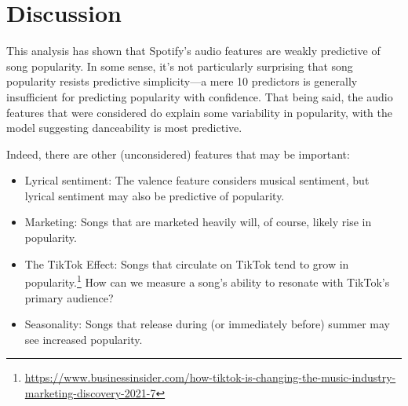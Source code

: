 \documentclass[12pt, twoside]{article}
\begin{document}
\section{Discussion}
This analysis has shown that Spotify's audio features are weakly predictive of song popularity.  In some sense, it's not particularly surprising that song popularity resists predictive simplicity---a mere 10 predictors is generally insufficient for predicting popularity with confidence. That being said, the audio features that were considered do explain some variability in popularity, with the model suggesting danceability is most predictive.  

Indeed, there are other (unconsidered) features that may be important: 
\begin{itemize}
  \item Lyrical sentiment: The valence feature considers musical sentiment, but lyrical sentiment  may also be predictive of popularity.
  \item Marketing: Songs that are marketed heavily will, of course, likely rise in popularity.
  \item The TikTok Effect: Songs that circulate on TikTok tend to grow in popularity.\footnote{\href{https://www.businessinsider.com/how-tiktok-is-changing-the-music-industry-marketing-discovery-2021-7}{\small{https://www.businessinsider.com/how-tiktok-is-changing-the-music-industry-marketing-discovery-2021-7}}} How can we measure a song's ability to resonate with TikTok's primary audience?
  \item Seasonality: Songs that release during (or immediately before) summer may see increased popularity.
\end{itemize}
\end{document}
